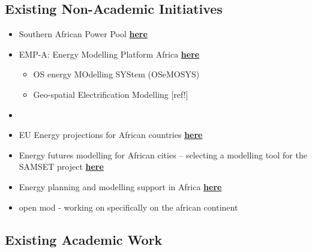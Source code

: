 \documentclass[conference, a4paper]{IEEEtran}
\begin{document}
\subsection{Existing Non-Academic Initiatives}
\begin{itemize}
\item Southern African Power Pool \href{https://globaltransmission.info/archive.php?id=36051}{\textbf{here}}
\item EMP-A: Energy Modelling Platform Africa \href{http://www.energymodellingplatform.org/africa.html}{\textbf{here}}
\begin{itemize}
\item OS energy MOdelling SYStem (OSeMOSYS) \cite{howells-rogner-ea-2011}
\item Geo-spatial Electrification Modelling [ref!]
\end{itemize}
\item 
\item EU Energy projections for African countries \href{https://op.europa.eu/en/publication-detail/-/publication/5bfffb22-fe1d-11e9-8c1f-01aa75ed71a1/language-en}{\textbf{here}}
\item Energy	futures	modelling	for	African	cities	– selecting	a	modelling	tool for the	SAMSET	project  \href{https://media.africaportal.org/documents/14Tait-etal-energy_futures_modelling.pdf}{\textbf{here}}
\item Energy planning and modelling support in Africa \href{{https://irena.org/-/media/Files/IRENA/Planning/IRENA_Modelling_support_Africa_2020.pdf?la=en&hash=C66FD1D23605A4F5065FBA47896EC55060A85B41}}{\textbf{here}}

\item open mod - working on specifically on the african continent

\end{itemize}

\subsection{Existing Academic Work}
\end{document}
